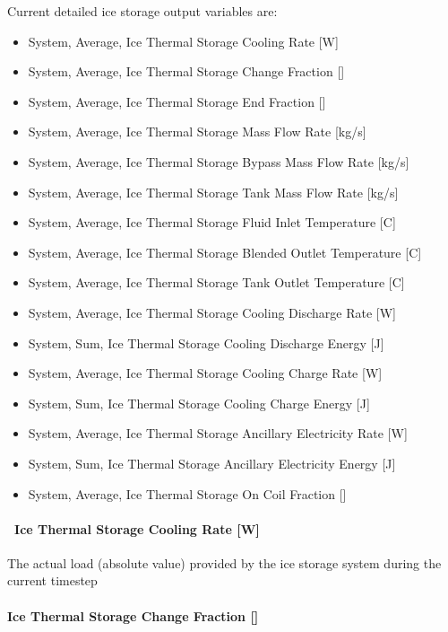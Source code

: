 Current detailed ice storage output variables are:

\begin{itemize}
\item
  System, Average, Ice Thermal Storage Cooling Rate {[}W{]}
\item
  System, Average, Ice Thermal Storage Change Fraction {[]}
\item
  System, Average, Ice Thermal Storage End Fraction {[]}
\item
  System, Average, Ice Thermal Storage Mass Flow Rate {[}kg/s{]}
\item
  System, Average, Ice Thermal Storage Bypass Mass Flow Rate {[}kg/s{]}
\item
  System, Average, Ice Thermal Storage Tank Mass Flow Rate {[}kg/s{]}
\item
  System, Average, Ice Thermal Storage Fluid Inlet Temperature {[}C{]}
\item
  System, Average, Ice Thermal Storage Blended Outlet Temperature {[}C{]}
\item
  System, Average, Ice Thermal Storage Tank Outlet Temperature {[}C{]}
\item
  System, Average, Ice Thermal Storage Cooling Discharge Rate {[}W{]}
\item
  System, Sum, Ice Thermal Storage Cooling Discharge Energy {[}J{]}
\item
  System, Average, Ice Thermal Storage Cooling Charge Rate {[}W{]}
\item
  System, Sum, Ice Thermal Storage Cooling Charge Energy {[}J{]}
\item
  System, Average, Ice Thermal Storage Ancillary Electricity Rate {[}W{]}
\item
  System, Sum, Ice Thermal Storage Ancillary Electricity Energy {[}J{]}
\item
  System, Average, Ice Thermal Storage On Coil Fraction {[]}
\end{itemize}

\paragraph{~Ice Thermal Storage Cooling Rate {[}W{]}}\label{ice-thermal-storage-cooling-rate-w}

The actual load (absolute value) provided by the ice storage system during the current timestep

\paragraph{Ice Thermal Storage Change Fraction {[]}}\label{ice-thermal-storage-change-fraction}


